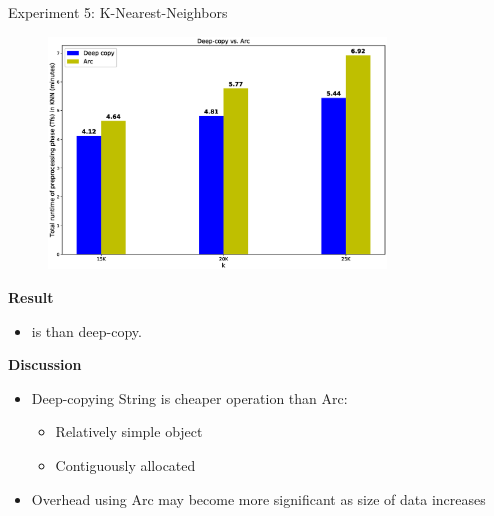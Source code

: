 \documentclass[9pt]{beamer}
\begin{document}
\begin{frame}[fragile]{Experiment 5: K-Nearest-Neighbors}
    \vspace{-0.5cm}
    \begin{figure}[hp]
        \centering
        \begin{center}
                \includegraphics[width=0.8\textwidth]{images/deepcopy_vs_arc.eps}
                \captionsetup{labelformat=empty}
        \end{center}
    \end{figure} 
    \vspace{-0.7cm}
    \textbf{Result}
    \begin{itemize}
        \item {} is  than deep-copy.
    \end{itemize}

    \textbf{Discussion}
    \begin{itemize}
        \item Deep-copying String is cheaper operation than Arc: 
        \begin{itemize}
            \item Relatively simple object
            \item Contiguously allocated
        \end{itemize}
        \item Overhead using Arc may become more significant as size of data increases
    \end{itemize} 
\end{frame}
\end{document}
